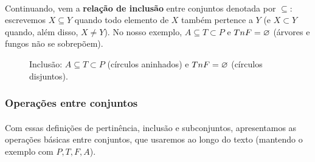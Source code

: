 \documentclass[12pt,a4paper]{article}
\def\cap{\string n}%
\begin{document}
\paragraph{}
Continuando, vem a \textbf{relação de inclusão} entre conjuntos denotada por \(\subseteq\): escrevemos \(X \subseteq Y\) quando todo elemento de \(X\) também pertence a \(Y\) (e \(X\subset Y\) quando, além disso, \(X\neq Y\)). No nosso exemplo, \(A\subseteq T\subset P\) e \(T\cap F=\varnothing\) (árvores e fungos não se sobrepõem).

\begin{figure}[H]
    \centering
    \caption{Inclusão: $A\subseteq T\subset P$ (círculos aninhados) e $T\cap F=\varnothing$ (círculos disjuntos).}
    \label{fig:inclusao}
\end{figure}

\subsubsection{Operações entre conjuntos}
\paragraph{}
Com essas definições de pertinência, inclusão e subconjuntos, apresentamos as operações básicas entre conjuntos, que usaremos ao longo do texto (mantendo o exemplo com \(P,T,F,A\)).
\end{document}

